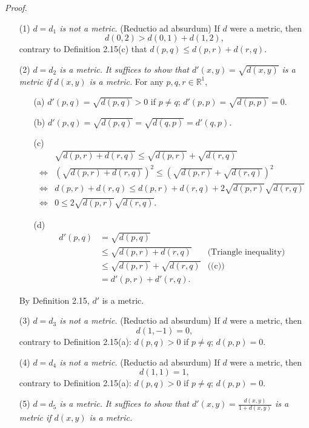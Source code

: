 \documentclass{article}
\begin{document}
\emph{Proof.}
\begin{enumerate}
\item[(1)]
\emph{$d = d_1$ is not a metric.}
(Reductio ad absurdum) If $d$ were a metric,
then $$d(0,2) > d(0,1)+d(1,2),$$
contrary to Definition 2.15(c) that $d(p,q) \leq d(p,r)+d(r,q)$.
\item[(2)]
\emph{$d = d_2$ is a metric.}
\emph{It suffices to show that
$d'(x,y) = \sqrt{d(x,y)}$ is a metric if $d(x,y)$ is a metric.}
  For any $p, q, r \in \mathbb{R}^1$,
  \begin{enumerate}
  \item[(a)]
  $d'(p,q) = \sqrt{d(p,q)} > 0$ if $p \neq q$;
  $d'(p,p) = \sqrt{d(p,p)} = 0$.
  \item[(b)]
  $d'(p,q) = \sqrt{d(p,q)} = \sqrt{d(q,p)} = d'(q,p)$.
  \item[(c)]
    \begin{align*}
    &\sqrt{d(p,r)+d(r,q)}
    \leq \sqrt{d(p,r)}+ \sqrt{d(r,q)} \\
    \Longleftrightarrow&
    (\sqrt{d(p,r)+d(r,q)})^2
    \leq (\sqrt{d(p,r)}+ \sqrt{d(r,q)})^2 \\
    \Longleftrightarrow&
    d(p,r)+d(r,q)
    \leq d(p,r)+d(r,q) + 2\sqrt{d(p,r)}\sqrt{d(r,q)} \\
    \Longleftrightarrow&
    0
    \leq 2\sqrt{d(p,r)}\sqrt{d(r,q)}.
    \end{align*}
  \item[(d)]
    \begin{align*}
    d'(p,q) &= \sqrt{d(p,q)} \\
    &\leq \sqrt{d(p,r)+d(r,q)}
      &\text{(Triangle inequality)} \\
    &\leq \sqrt{d(p,r)}+ \sqrt{d(r,q)}
      &\text{((c))} \\
    &= d'(p,r) + d'(r,q).
    \end{align*}
  \end{enumerate}
  By Definition 2.15, $d'$ is a metric.
\item[(3)]
\emph{$d = d_3$ is not a metric.}
(Reductio ad absurdum) If $d$ were a metric,
then $$d(1,-1) = 0,$$
contrary to Definition 2.15(a): $d(p,q) > 0$ if $p \neq q$; $d(p,p) = 0$.
\item[(4)]
\emph{$d = d_4$ is not a metric.}
(Reductio ad absurdum) If $d$ were a metric,
then $$d(1,1) = 1,$$
contrary to Definition 2.15(a): $d(p,q) > 0$ if $p \neq q$; $d(p,p) = 0$.
\item[(5)]
\emph{$d = d_5$ is a metric.}
\emph{It suffices to show that
$d'(x,y) = \frac{d(x,y)}{1+d(x,y)}$ is a metric if $d(x,y)$ is a metric.}

\end{enumerate}
\end{document}
